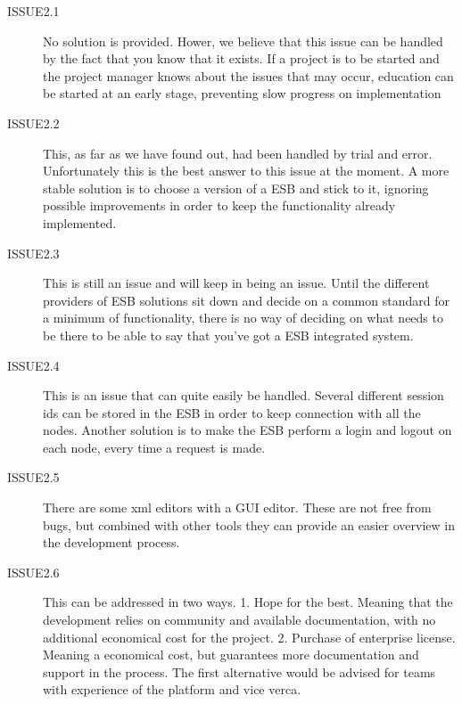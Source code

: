 \documentclass{llncs}
\begin{document}
\begin{description}
\begin{description}
\item[ISSUE2.1] No solution is provided. Hower, we believe that this issue can be handled by the fact that you know that it exists. If a project is to be started and the project manager knows about the issues that may occur, education can be started at an early stage, preventing slow progress on implementation
\item[ISSUE2.2] This, as far as we have found out, had been handled by trial and error. Unfortunately this is the best answer to this issue at the moment. A more stable solution is to choose a version of a ESB and stick to it, ignoring possible improvements in order to keep the functionality already implemented.
\item[ISSUE2.3] This is still an issue and will keep in being an issue. Until the different providers of ESB solutions sit down and decide on a common standard for a minimum of functionality, there is no way of deciding on what needs to be there to be able to say that you’ve got a ESB integrated system.
\item[ISSUE2.4] This is an issue that can quite easily be handled. Several different session ids can be stored in the ESB in order to keep connection with all the nodes. Another solution is to make the ESB perform a login and logout on each node, every time  a request is made.
\item[ISSUE2.5] There are some xml editors with a GUI editor. These are not free from bugs, but combined with other tools they can provide an easier overview in the development process.
\item[ISSUE2.6] This can be addressed in two ways. 1. Hope for the best. Meaning that the development relies on community and available documentation, with no additional economical cost for the project. 2. Purchase of enterprise license. Meaning a economical cost, but guarantees more documentation and support in the process. The first alternative would be advised for teams with experience of the platform and vice verca.
\end{description}

\end{description}
\end{document}

